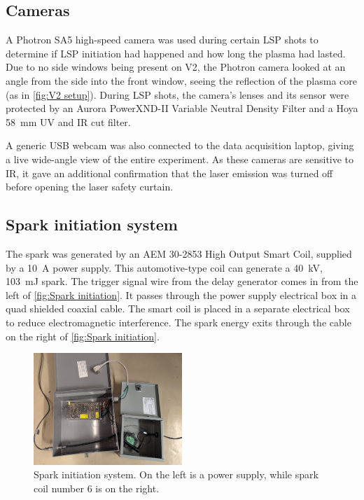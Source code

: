         \subsection{Cameras}

            A Photron SA5 high-speed camera was used during certain LSP shots to determine if LSP initiation had happened and how long the plasma had lasted. Due to no side windows being present on V2, the Photron camera looked at an angle from the side into the front window, seeing the reflection of the plasma core (as in \autoref{fig:V2 setup}). During LSP shots, the camera's lenses and its sensor were protected by an Aurora PowerXND-II Variable Neutral Density Filter and a Hoya \qty{58}{mm} UV and IR cut filter.

            A generic USB webcam was also connected to the data acquisition laptop, giving a live wide-angle view of the entire experiment. As these cameras are sensitive to IR, it gave an additional confirmation that the laser emission was turned off before opening the laser safety curtain.

        \subsection{Spark initiation system}

            The spark was generated by an AEM 30-2853 High Output Smart Coil, supplied by a \qty{10}{A} power supply. This automotive-type coil can generate a \qty{40}{kV}, \qty{103}{mJ} spark. The trigger signal wire from the delay generator comes in from the left of \autoref{fig:Spark initiation}. It passes through the power supply electrical box in a quad shielded coaxial cable. The smart coil is placed in a separate electrical box to reduce electromagnetic interference. The spark energy exits through the cable on the right of \autoref{fig:Spark initiation}. 

            \begin{figure}[!ht]
                \centering
                \includegraphics[width=0.50\textwidth]{assets/3 design/Spark initiation system.jpg}
                \caption{Spark initiation system. On the left is a power supply, while spark coil number 6 is on the right.}
                \label{fig:Spark initiation}
            \end{figure}

